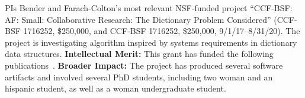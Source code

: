 PIs Bender and Farach-Colton's most relevant NSF-funded project ``CCF-BSF: AF: Small: Collaborative Research: The Dictionary Problem Considered''
(CCF-BSF 1716252, \$250,000, and CCF-BSF 1716252, \$250,000, 9/1/17--8/31/20).
The project is investigating algorithm inspired by systems requirements in dictionary data structures.
{\textbf{Intellectual Merit:}} This grant has funded the following
publications~\cite{AgrawalBeDa20,AgrawalBeFi20,%
ArkinDaGa20,AshkianiFaOw18,AshkianiLiFa18,BenderChDa20,BenderCoFa19,BenderDaJo20,BenderFaGo18,%
BenderFaKu19,BenderGoMe20,BenderKoKu20,ChenMcSi18,ConwayBaJi17b,ConwayFaSh18,ConwayKnJi19,%
DasAgBe20,DasTsDu18,DasTsDu19,BerceaEv20a,BerceaEv20b,%
ZhanCoJi18,ZhanJaPo18,ZhanJaPo18,Mayer18,Pandey19,PandeyAlBe18,PandeyBeJo17a,%
PandeyBeJo17b,PandeyBeJo17c,PandeyBeJo18,Singh18,SinghMaBe20,%
JavanmardGaDa19PPoPP,%
JavanmardGaDa19DISC,%
GoswamiMeMe18,%
GeilFaOw18,PandeySiBe20,%
EvenMeRa18,ConwayFaSh18,AwadAsJo19,BenderFiGi19,Farach-ColtonLiTs18,BenderKoPe18}.
\textbf{Broader Impact:} The project has produced several software artifacts and involved several PhD students, including two woman and an hispanic student, as well as a woman undergraduate student.